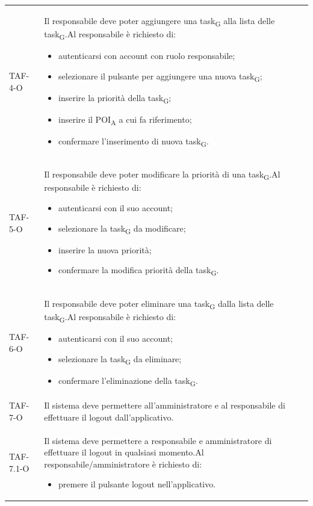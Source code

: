 \begin{longtable}{ >{\centering}p{} >{}p{}
		>{\centering}p{}}
	TAF-4-O & Il responsabile deve poter aggiungere una task\textsubscript{G} alla lista delle task\textsubscript{G}.\newline Al responsabile è richiesto di: \begin{itemize}\item autenticarsi con account con ruolo responsabile; \item selezionare il pulsante per aggiungere una nuova task\textsubscript{G}; \item inserire la priorità della task\textsubscript{G}; \item inserire il POI\textsubscript{A} a cui fa riferimento; \item confermare l'inserimento di nuova task\textsubscript{G}. \end{itemize} & 0\tabularnewline

	TAF-5-O & Il responsabile deve poter modificare la priorità di una task\textsubscript{G}.\newline Al responsabile è richiesto di: \begin{itemize}\item autenticarsi con il suo account; \item selezionare la task\textsubscript{G} da modificare; \item inserire la nuova priorità; \item confermare la modifica priorità della task\textsubscript{G}. \end{itemize} & 0\tabularnewline

	TAF-6-O & Il responsabile deve poter eliminare una task\textsubscript{G} dalla lista delle task\textsubscript{G}.\newline Al responsabile è richiesto di: \begin{itemize} \item autenticarsi con il suo account; \item selezionare la task\textsubscript{G} da eliminare; \item confermare l'eliminazione della task\textsubscript{G}. \end{itemize} & 0\tabularnewline

	TAF-7-O & Il sistema deve permettere all'amministratore e al responsabile di effettuare il logout dall'applicativo. & 0\tabularnewline
	TAF-7.1-O & Il sistema deve permettere a responsabile e amministratore di effettuare il logout in qualsiasi momento.\newline Al responsabile/amministratore è richiesto di: \begin{itemize} \item premere il pulsante logout nell'applicativo. \end{itemize} & 0\tabularnewline


\end{longtable}
